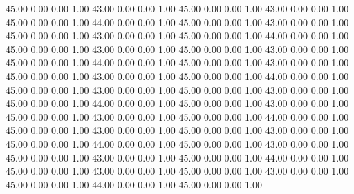    45.00   0.00   0.00   1.00
   43.00   0.00   0.00   1.00
   45.00   0.00   0.00   1.00
   43.00   0.00   0.00   1.00
   45.00   0.00   0.00   1.00
   44.00   0.00   0.00   1.00
   45.00   0.00   0.00   1.00
   43.00   0.00   0.00   1.00
   45.00   0.00   0.00   1.00
   43.00   0.00   0.00   1.00
   45.00   0.00   0.00   1.00
   44.00   0.00   0.00   1.00
   45.00   0.00   0.00   1.00
   43.00   0.00   0.00   1.00
   45.00   0.00   0.00   1.00
   43.00   0.00   0.00   1.00
   45.00   0.00   0.00   1.00
   44.00   0.00   0.00   1.00
   45.00   0.00   0.00   1.00
   43.00   0.00   0.00   1.00
   45.00   0.00   0.00   1.00
   43.00   0.00   0.00   1.00
   45.00   0.00   0.00   1.00
   44.00   0.00   0.00   1.00
   45.00   0.00   0.00   1.00
   43.00   0.00   0.00   1.00
   45.00   0.00   0.00   1.00
   43.00   0.00   0.00   1.00
   45.00   0.00   0.00   1.00
   44.00   0.00   0.00   1.00
   45.00   0.00   0.00   1.00
   43.00   0.00   0.00   1.00
   45.00   0.00   0.00   1.00
   43.00   0.00   0.00   1.00
   45.00   0.00   0.00   1.00
   44.00   0.00   0.00   1.00
   45.00   0.00   0.00   1.00
   43.00   0.00   0.00   1.00
   45.00   0.00   0.00   1.00
   43.00   0.00   0.00   1.00
   45.00   0.00   0.00   1.00
   44.00   0.00   0.00   1.00
   45.00   0.00   0.00   1.00
   43.00   0.00   0.00   1.00
   45.00   0.00   0.00   1.00
   43.00   0.00   0.00   1.00
   45.00   0.00   0.00   1.00
   44.00   0.00   0.00   1.00
   45.00   0.00   0.00   1.00
   43.00   0.00   0.00   1.00
   45.00   0.00   0.00   1.00
   43.00   0.00   0.00   1.00
   45.00   0.00   0.00   1.00
   44.00   0.00   0.00   1.00
   45.00   0.00   0.00   1.00